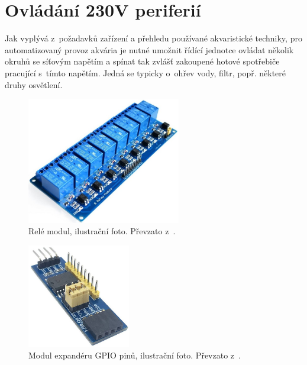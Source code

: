 \section{Ovládání 230V periferií}

Jak vyplývá z~požadavků zařízení a přehledu používané akvaristické techniky, pro automatizovaný provoz akvária je nutné umožnit řídící jednotce ovládat několik okruhů se síťovým napětím a spínat tak zvlášť zakoupené hotové spotřebiče pracující s~tímto napětím. Jedná se typicky o~ohřev vody, filtr, popř. některé druhy osvětlení. 

\begin{figure}[h!]
    \centering
    \includegraphics[width=0.6\textwidth]{obrazky/230/rele.jpg}
    \caption{Relé modul, ilustrační foto. Převzato z~\cite{eshop-laskakit-rele}.}
    \label{fig:obrazky-230-rele-jpg}
\end{figure}

\begin{figure}[h!]
    \centering
    \includegraphics[width=0.4\textwidth]{obrazky/230/expander.jpg}
    \caption{Modul expandéru GPIO pinů, ilustrační foto. Převzato z~\cite{eshop-laskakit-expander}.}
    \label{fig:obrazky-230-expander-jpg}
\end{figure}

